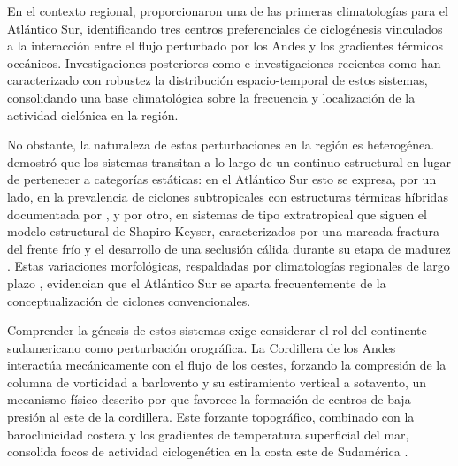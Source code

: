 
En el contexto regional, \citet{reboita2010south} proporcionaron una de las primeras climatologías para el Atlántico Sur, identificando tres centros preferenciales de ciclogénesis vinculados a la interacción entre el flujo perturbado por los Andes y los gradientes térmicos oceánicos. Investigaciones posteriores como \citet{gramcianinov2020analysis} e investigaciones recientes como \citet{padilhareinke2026characterization} han caracterizado con robustez la distribución espacio-temporal de estos sistemas, consolidando una base climatológica sobre la frecuencia y localización de la actividad ciclónica en la región.

No obstante, la naturaleza de estas perturbaciones en la región es heterogénea. \citet{hart2003cyclone} demostró que los sistemas transitan a lo largo de un continuo estructural en lugar de pertenecer a categorías estáticas: en el Atlántico Sur esto se expresa, por un lado, en la prevalencia de ciclones subtropicales con estructuras térmicas híbridas documentada por \citet{evans2012climatology}, y por otro, en sistemas de tipo extratropical que siguen el modelo estructural de Shapiro-Keyser, caracterizados por una marcada fractura del frente frío y el desarrollo de una seclusión cálida durante su etapa de madurez \citep{gozzo2013air}. Estas variaciones morfológicas, respaldadas por climatologías regionales de largo plazo \citep{gozzo2014subtropical}, evidencian que el Atlántico Sur se aparta frecuentemente de la conceptualización de ciclones convencionales.

Comprender la génesis de estos sistemas exige considerar el rol del continente sudamericano como perturbación orográfica. La Cordillera de los Andes interactúa mecánicamente con el flujo de los oestes, forzando la compresión de la columna de vorticidad a barlovento y su estiramiento vertical a sotavento, un mecanismo físico descrito por \citet{gan1994influence} que favorece la formación de centros de baja presión al este de la cordillera. Este forzante topográfico, combinado con la baroclinicidad costera y los gradientes de temperatura superficial del mar, consolida focos de actividad ciclogenética en la costa este de Sudamérica \citep{reboita2026meteorology}.

